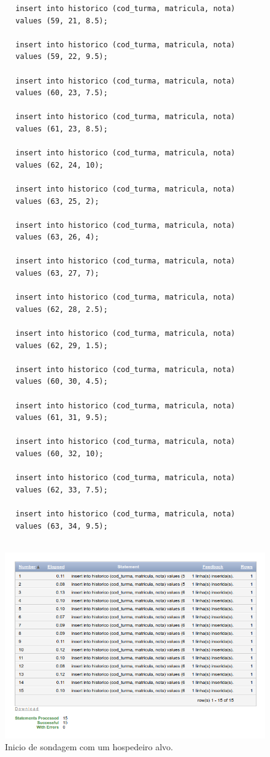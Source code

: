 \documentclass[
article,			%
11pt,				%
oneside,			%
a4paper,			%
english,			%
brazil,				%
sumario=tradicional
]{abntex2}
\begin{document}
\begin{enumerate}
		\begin{verbatim}
		insert into historico (cod_turma, matricula, nota)
		values (59, 21, 8.5);
		
		insert into historico (cod_turma, matricula, nota)
		values (59, 22, 9.5);
		
		insert into historico (cod_turma, matricula, nota)
		values (60, 23, 7.5);
		
		insert into historico (cod_turma, matricula, nota)
		values (61, 23, 8.5);
		
		insert into historico (cod_turma, matricula, nota)
		values (62, 24, 10);
		
		insert into historico (cod_turma, matricula, nota)
		values (63, 25, 2);
		
		insert into historico (cod_turma, matricula, nota)
		values (63, 26, 4);
		
		insert into historico (cod_turma, matricula, nota)
		values (63, 27, 7);
		
		insert into historico (cod_turma, matricula, nota)
		values (62, 28, 2.5);
		
		insert into historico (cod_turma, matricula, nota)
		values (62, 29, 1.5);
		
		insert into historico (cod_turma, matricula, nota)
		values (60, 30, 4.5);
		
		insert into historico (cod_turma, matricula, nota)
		values (61, 31, 9.5);
		
		insert into historico (cod_turma, matricula, nota)
		values (60, 32, 10);
		
		insert into historico (cod_turma, matricula, nota)
		values (62, 33, 7.5);
		
		insert into historico (cod_turma, matricula, nota)
		values (63, 34, 9.5);​
		​
		\end{verbatim}
		\vspace{0.0cm}
		\begin{center}
			\begin{figure}[H]
				\centering
				\includegraphics[scale=0.5]{./at-05.png}
				\caption{Inicio de sondagem com um hospedeiro alvo.}
				\label{rota-1}
			\end{figure}
		\end{center}
\end{enumerate}
	
\end{document}
